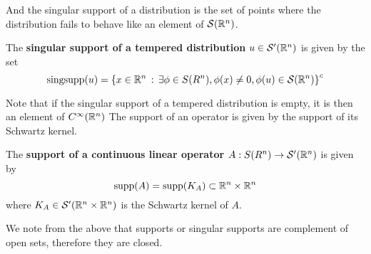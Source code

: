 \documentclass[12pt]{article}
\begin{document}
And the singular support of a distribution is the set of points where the distribution fails to behave like an element of $\mathcal{S}({\mathbb R}^n)$. 
\begin{fdefinition}
    The \textbf{singular support of a tempered distribution} $ u \in \mathcal{S}'({\mathbb R}^n)$ is given by the set 
    \[
    \mathrm{sing supp}(u) = \left\{x \in {\ensuremath {\mathbb R}}^n \, : \, \exists \phi \in S(R^n), \phi(x) \neq 0, \phi(u) \in \mathcal{S}({\mathbb R}^n)\right\}^c
    \]
\end{fdefinition}
Note that if the singular support of a tempered distribution is empty, it is then an element of $C^\infty({\mathbb R}^n)$ 
The support of an operator is given by the support of its Schwartz kernel. 
\begin{fdefinition}
    The \textbf{support of a continuous linear operator} $A: S(R^n) \to \mathcal{S}'({\mathbb R}^n)$ is given by 
    \[
    \mathrm{supp}(A) = \mathrm{supp}(K_A) \subset {\ensuremath {\mathbb R}}^n \times {\ensuremath {\mathbb R}}^n
    \]
    where $K_A \in \mathcal{S}'({\mathbb R}^n \times {\ensuremath {\mathbb R}}^n)$ is the Schwartz kernel of $A$. 
\end{fdefinition}

We note from the above that supports or singular supports are complement of open sets, therefore they are closed. 
%
%
%
\end{document}
